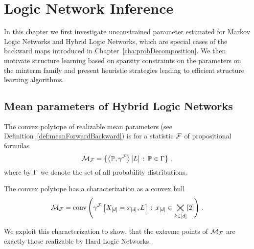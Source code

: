 \section{Logic Network Inference}\label{cha:networkLearning}

In this chapter we first investigate unconstrained parameter estimated for Markov Logic Networks and Hybrid Logic Networks, which are special cases of the backward maps introduced in Chapter~\ref{cha:probDecomposition}.
We then motivate structure learning based on sparsity constraints on the parameters on the minterm family and present heuristic strategies leading to efficient structure learning algorithms.

\subsection{Mean parameters of Hybrid Logic Networks}

The convex polytope of realizable mean parameters (see Definition~\ref{def:meanForwardBackward}) is for a statistic $\mathcal{F}$ of propositional formulas
	\[ \mathcal{M}_{\mathcal{F}} = \left\{ \left\langle \mathbb{P},\gamma^{\mathcal{F}}\right\rangle \left[ L \right] \, : \, \mathbb{P}\in\Gamma \right\} \, ,\]
where by $\Gamma$ we denote the set of all probability distributions.

The convex polytope has a characterization as a convex hull
\begin{align}\label{eq:hlnMeansetConvCharacterization}
	\mathcal{M}_{\mathcal{F}} = \mathrm{conv}\left(\gamma^{\mathcal{F}}\left[X_{[d]}=x_{[d]},L\right] \, : \, x_{[d]}\in\bigtimes_{k\in[d]}[2]\right) \, . 
\end{align}

We exploit this characterization to show, that the extreme points of $\mathcal{M}_{\mathcal{F}}$ are exactly those realizable by Hard Logic Networks.

